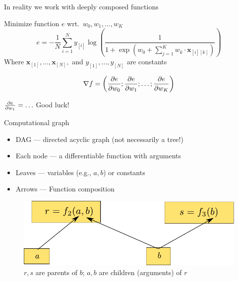 \documentclass[12pt,aspectratio=169,handout]{beamer}
\begin{document}
\begin{frame}{In reality we work with deeply composed functions}
	
	\begin{example}
		Minimize function $e$ wrt.\ $w_0, w_1, \ldots, w_K$
		$$
		e = - \frac{1}{N} \sum_{i = 1}^{N} y_{[i]} \log
		\left(
		\frac{1}{1 +
			\exp\left( w_0 + \sum_{j=1}^{K} w_k \cdot \bm{x}_{[i][k]} \right)
		}
		\right)
		$$
		Where $\bm{x}_{[1]}, \ldots, \bm{x}_{[N]},$ and $y_{[1]}, \ldots, y_{[N]}$ are constants
	\end{example}
	
	\pause
	
	$$
	\nabla f = \left( \pdv{e}{w_0}; \pdv{e}{w_1}; \ldots; \pdv{e}{w_K} \right)
	$$
	
	$\pdv{e}{w_1} = \ldots$ \pause Good luck!
	
\end{frame}


%	
%	
%	
%	
%	


\begin{frame}{Computational graph}
	\begin{itemize}
		\item DAG --- directed acyclic graph (not necessarily a tree!)
		\item Each node --- a differentiable function with arguments
		\item Leaves --- variables (e.g., $a, b$) or constants
		\item Arrows --- Function composition
	\end{itemize}
	
	\begin{figure}
		\includegraphics[width=0.75\linewidth]{img/parent-child.pdf}
		\caption{$r, s$ are parents of $b$; $a, b$ are children (arguments) of $r$}
	\end{figure}
	
	
	
\end{frame}
\end{document}
